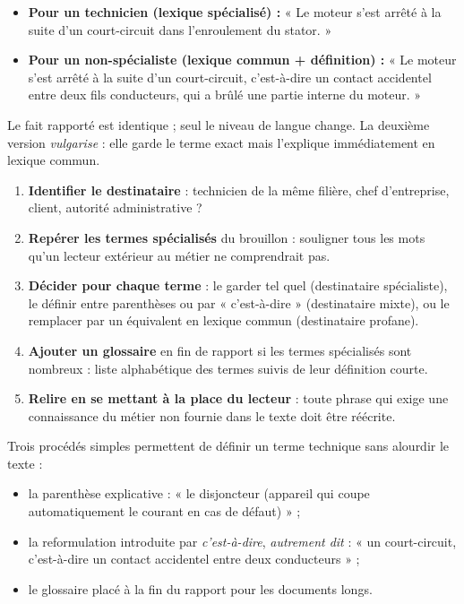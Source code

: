 \documentclass[11pt]{article}
\newcommand{\cle}[1]{{\popxbold\color{popdark}#1}}
\begin{document}
\begin{exemplebox}
\begin{itemize}
\item \textbf{Pour un technicien (lexique spécialisé) :} « Le moteur s'est arrêté à la suite d'un court-circuit dans l'enroulement du stator. »
\item \textbf{Pour un non-spécialiste (lexique commun + définition) :} « Le moteur s'est arrêté à la suite d'un court-circuit, c'est-à-dire un contact accidentel entre deux fils conducteurs, qui a brûlé une partie interne du moteur. »
\end{itemize}
Le fait rapporté est identique ; seul le niveau de langue change. La deuxième version \emph{vulgarise} : elle garde le terme exact mais l'explique immédiatement en lexique commun.
\end{exemplebox}

\begin{methode}
\begin{enumerate}
\item \textbf{Identifier le destinataire} : technicien de la même filière, chef d'entreprise, client, autorité administrative ?
\item \textbf{Repérer les termes spécialisés} du brouillon : souligner tous les mots qu'un lecteur extérieur au métier ne comprendrait pas.
\item \textbf{Décider pour chaque terme} : le garder tel quel (destinataire spécialiste), le définir entre parenthèses ou par « c'est-à-dire » (destinataire mixte), ou le remplacer par un équivalent en lexique commun (destinataire profane).
\item \textbf{Ajouter un glossaire} en fin de rapport si les termes spécialisés sont nombreux : liste alphabétique des termes suivis de leur définition courte.
\item \textbf{Relire en se mettant à la place du lecteur} : toute phrase qui exige une connaissance du métier non fournie dans le texte doit être réécrite.
\end{enumerate}
\end{methode}

\begin{aretenir}
Trois procédés simples permettent de définir un terme technique sans alourdir le texte :
\begin{itemize}
\item la \cle{parenthèse explicative} : « le disjoncteur (appareil qui coupe automatiquement le courant en cas de défaut) » ;
\item la \cle{reformulation} introduite par \emph{c'est-à-dire}, \emph{autrement dit} : « un court-circuit, c'est-à-dire un contact accidentel entre deux conducteurs » ;
\item le \cle{glossaire} placé à la fin du rapport pour les documents longs.
\end{itemize}
\end{aretenir}
\end{document}
